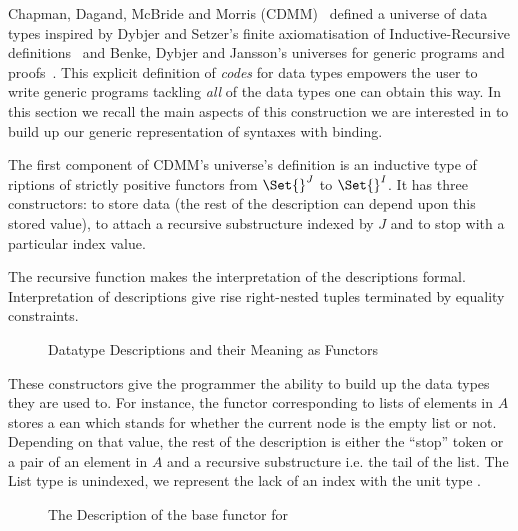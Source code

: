 Chapman, Dagand, McBride and Morris (CDMM)~\citeyear{Chapman:2010:GAL:1863543.1863547}
defined a universe of data types inspired by Dybjer and Setzer's
finite axiomatisation of Inductive-Recursive definitions~\citeyear{Dybjer1999}
and Benke, Dybjer and Jansson's universes for generic programs and proofs~\citeyear{benke-ugpp}.
This explicit definition of \emph{codes} for data types empowers the
user to write generic programs tackling \emph{all} of the data types
one can obtain this way. In this section we recall the main aspects
of this construction we are interested in to build up our generic
representation of syntaxes with binding.

The first component of CDMM's universe's definition is an inductive type
of riptions of strictly positive functors from $\Set{}^J$ to
$\Set{}^I$. It has three constructors:  to store data (the rest of
the description can depend upon this stored value),  to attach a
recursive substructure indexed by $J$ and  to stop with a particular
index value.

The recursive function  makes the interpretation of the
descriptions formal. Interpretation of descriptions give rise right-nested tuples
terminated by equality constraints.

\begin{figure}[h]
\hspace{-1em}\begin{minipage}{0.50\textwidth}
\end{minipage}\hspace{2em}
\begin{minipage}{0.40\textwidth}
\end{minipage}
\caption{Datatype Descriptions and their Meaning as Functors}\label{figure:desc}
\end{figure}

These constructors give the programmer the ability to build up the data
types they are used to. For instance, the functor corresponding
to lists of elements in $A$ stores a ean which stands for whether
the current node is the empty list or not. Depending on that value, the
rest of the description is either the ``stop'' token or a pair of an element
in $A$ and a recursive substructure i.e. the tail of the list. The List type
is unindexed, we represent the lack of an index with the unit type \AD{$\top$}.

\begin{figure}[h]
\caption{The Description of the base functor for  }\label{figure:listD}
\end{figure}

